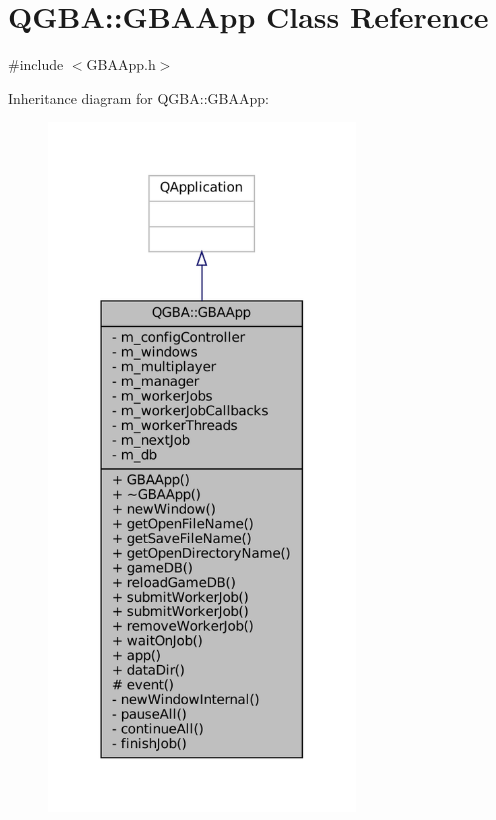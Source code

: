 \hypertarget{class_q_g_b_a_1_1_g_b_a_app}{}\section{Q\+G\+BA\+:\+:G\+B\+A\+App Class Reference}
\label{class_q_g_b_a_1_1_g_b_a_app}


{\ttfamily \#include $<$G\+B\+A\+App.\+h$>$}



Inheritance diagram for Q\+G\+BA\+:\+:G\+B\+A\+App\+:
\nopagebreak
\begin{figure}[H]
\begin{center}
\leavevmode
\includegraphics[width=231pt]{class_q_g_b_a_1_1_g_b_a_app__inherit__graph}
\end{center}
\end{figure}



